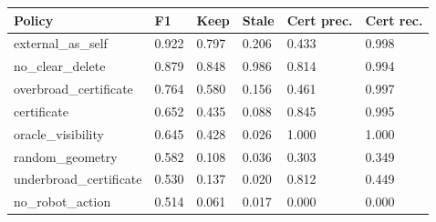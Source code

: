 \begin{tabular}{llllll}
\toprule
Policy & F1 & Keep & Stale & Cert prec. & Cert rec. \\
\midrule
external\_as\_self & 0.922 & 0.797 & 0.206 & 0.433 & 0.998 \\
no\_clear\_delete & 0.879 & 0.848 & 0.986 & 0.814 & 0.994 \\
overbroad\_certificate & 0.764 & 0.580 & 0.156 & 0.461 & 0.997 \\
certificate & 0.652 & 0.435 & 0.088 & 0.845 & 0.995 \\
oracle\_visibility & 0.645 & 0.428 & 0.026 & 1.000 & 1.000 \\
random\_geometry & 0.582 & 0.108 & 0.036 & 0.303 & 0.349 \\
underbroad\_certificate & 0.530 & 0.137 & 0.020 & 0.812 & 0.449 \\
no\_robot\_action & 0.514 & 0.061 & 0.017 & 0.000 & 0.000 \\
\bottomrule
\end{tabular}

